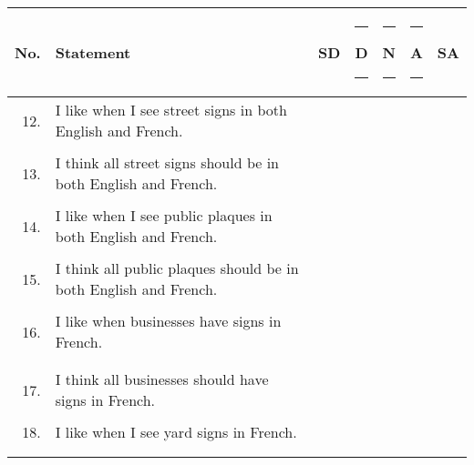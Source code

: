     \begin{longtable}[c]{| r p{} | c | c | c | c | c |}
      \hline
      No. & Statement                                                                 & SD & \rule{3pt}{0pt}D\rule{3pt}{0pt} & \rule{3pt}{0pt}N\rule{3pt}{0pt} & \rule{3pt}{0pt}A\rule{3pt}{0pt} & SA \endhead
      \hline
      \multicolumn{6}{c}{Signs} \\
      \hline
      12. & I like when I see street signs in both English and French.                & & & & & \\
          &                                                                           & & & & & \\
      \hline
      13. & I think all street signs should be in both English and French.            & & & & & \\
          &                                                                           & & & & & \\
      \hline
      14. & I like when I see public plaques in both English and French.              & & & & & \\
          &                                                                           & & & & & \\
      \hline
      15. & I think all public plaques should be in both English and French.          & & & & & \\
          &                                                                           & & & & & \\
      \hline
      16. & I like when businesses have signs in French.                              & & & & & \\
          &                                                                           & & & & & \\
          &                                                                           & & & & & \\
      \hline
      17. & I think all businesses should have signs in French.                       & & & & & \\
          &                                                                           & & & & & \\
      \hline
      18. & I like when I see yard signs in French.                                   & & & & & \\
          &                                                                           & & & & & \\
          &                                                                           & & & & & \\

\end{longtable}
